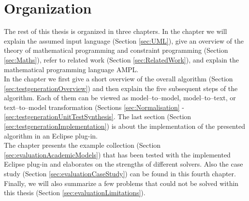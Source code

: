 

\section{Organization}
The rest of this thesis is organized in three chapters. In the chapter  we will explain the assumed input language (Section \ref{sec:UML}), give an overview of the theory of mathematical programming and constraint programming (Section \ref{sec:Maths}), refer to related work (Section \ref{sec:RelatedWork}), and explain the mathematical programming language AMPL.\\
In the chapter  we first give a short overview of the overall algorithm (Section \ref{sec:testgenerationOverview}) and then explain the five subsequent steps of the algorithm. Each of them can be viewed as model--to--model, model--to--text, or text--to--model transformation (Sections \ref{sec:Normalisation} - \ref{sec:testgenerationUnitTestSynthesis}. The last section (Section \ref{sec:testgenerationImplementation}) is about the implementation of the presented algorithm in an Eclipse plug-in.\\
The chapter  presents the example collection (Section \ref{sec:evaluationAcademicModels}) that has been tested with the implemented Eclipse plug-in and elaborates on the strengths of different solvers. Also the case study (Section \ref{sec:evaluationCaseStudy}) can be found in this fourth chapter. Finally, we will also summarize a few problems that could not be solved within this thesis (Section \ref{sec:evaluationLimitations}).